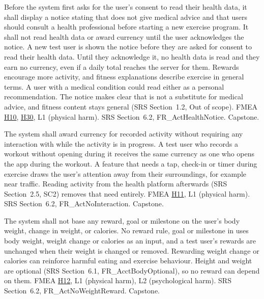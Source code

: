 \documentclass{article}
\newcommand{\hazref}[1]{\hyperref[#1]{#1}}
\begin{document}
\begin{description}
{Before the system first asks for the user's consent to read their health
data, it shall display a notice stating that \progname{} does not give medical
advice and that users should consult a health professional before starting a
new exercise program. It shall not read health data or award currency until the
user acknowledges the notice.}
{A new test user is shown the notice before they are asked for consent to read
their health data. Until they acknowledge it, no health data is read and they
earn no currency, even if a daily total reaches the server for them.}
{Rewards encourage more activity, and fitness explanations describe exercise
in general terms. A user with a medical condition could read either as a
personal recommendation. The notice makes clear that \progname{} is not a
substitute for medical advice, and fitness content stays general
(SRS Section~1.2, Out of scope).}
{FMEA \hazref{H10}, \hazref{H30}, L1 (physical harm).}
{SRS Section~6.2, FR\_ActHealthNotice.}
{Capstone.}

{The system shall award currency for recorded activity without requiring any
interaction with \progname{} while the activity is in progress.}
{A test user who records a workout without opening \progname{} during it
receives the same currency as one who opens the app during the workout.}
{A feature that needs a tap, check-in or timer during exercise draws the
user's attention away from their surroundings, for example near traffic.
Reading activity from the health platform afterwards
(SRS Section~2.5, SC2) removes that need entirely.}
{FMEA \hazref{H11}, L1 (physical harm).}
{SRS Section~6.2, FR\_ActNoInteraction.}
{Capstone.}

{The system shall not base any reward, goal or milestone on the user's body
weight, change in weight, or calories.}
{No reward rule, goal or milestone in \progname{} uses body weight, weight
change or calories as an input, and a test user's rewards are unchanged when
their weight is changed or removed.}
{Rewarding weight change or calories can reinforce harmful eating and exercise
behaviour. Height and weight are optional (SRS Section~6.1,
FR\_AcctBodyOptional), so no reward can depend on them.}
{FMEA \hazref{H12}, L1 (physical harm), L2 (psychological harm).}
{SRS Section~6.2, FR\_ActNoWeightReward.}
{Capstone.}

\end{description}
\end{document}
